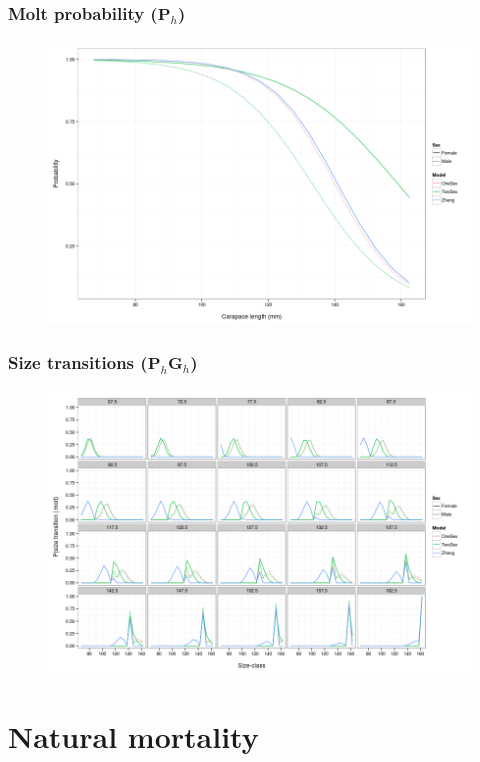 \documentclass{beamer}
\begin{document}
\begin{frame}
\frametitle{Molt probability ($\boldsymbol{P}_h$)}
\begin{figure}[!htbp]
  \centering
  \includegraphics[width=0.75\linewidth]{figure/molt_prob-1.png}
\end{figure}
\end{frame}


\begin{frame}
\frametitle{Size transitions  ($\boldsymbol{P}_h \boldsymbol{G}_h$)}
\begin{figure}[!htbp]
  \centering
  \includegraphics[width=0.75\linewidth]{figure/size_trans-1.png}
\end{figure}
\end{frame}


\section{Natural mortality}
\end{document}
